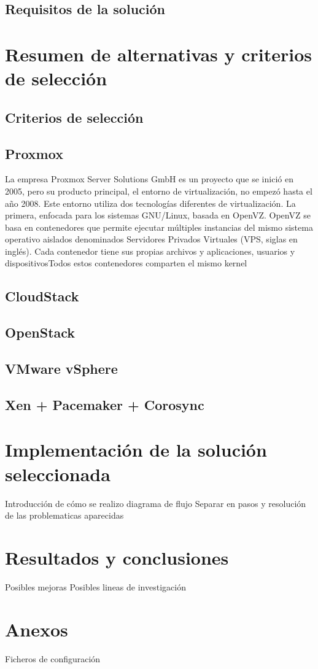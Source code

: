\documentclass[12pt,a4paper,titlepage,twoside]{report}
\begin{document}
\section{Requisitos de la solución}

\chapter{Resumen de alternativas y criterios de selección}
\section{Criterios de selección}
\section{Proxmox}
La empresa Proxmox Server Solutions GmbH es un proyecto que se inició en 2005, pero su producto principal, el entorno de virtualización, no empezó hasta el año 2008. Este entorno utiliza dos tecnologías diferentes de virtualización. La primera, enfocada para los sistemas GNU/Linux, basada en OpenVZ. OpenVZ se basa en contenedores que permite ejecutar múltiples instancias del mismo sistema operativo aislados denominados Servidores Privados Virtuales (VPS, siglas en inglés). Cada contenedor tiene sus propias archivos y aplicaciones, usuarios y dispositivosTodos estos contenedores comparten el mismo kernel
\section{CloudStack}
\section{OpenStack}
\section{VMware vSphere}
\section{Xen + Pacemaker + Corosync}

\chapter{Implementación de la solución seleccionada}
Introducción de cómo se realizo
diagrama de flujo
Separar en pasos y resolución de las problematicas aparecidas
\chapter{Resultados y conclusiones}
Posibles mejoras
Posibles lineas de investigación
\chapter{Anexos}
Ficheros de configuración

\nocite{*}
\printbibliography
\end{document}
